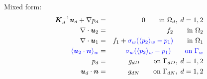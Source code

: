   Mixed form:
  \begin{eqnarray}
\mathbf{\boldsymbol{K}}_d^{-1}\mathbf{\boldsymbol{u}}_d + \nabla p_d &=& 0 \qquad \textrm{in } \Omega_d,\; d=1,2  \\
\nabla \cdot \mathbf{\boldsymbol{u}}_2 &=& f_2 \qquad \textrm{in } \Omega_2\\
\nabla \cdot \mathbf{\boldsymbol{u}}_1 &=& f_1 + {\color{blue}\sigma_w(\langle p_2\rangle_w-p_1)}\qquad \textrm{in } \Omega_1\\
\color{blue}\langle\mathbf{\boldsymbol{u}}_2 \cdot \mathbf{\boldsymbol{n}}\rangle_w &=& \color{blue}\sigma_w (\langle p_2\rangle_w - p_{1}) \qquad \textrm{on } \Gamma_w\\
p_d &=& g_{dD} \qquad \textrm{on } \Gamma_{dD},\; d=1,2 \\
\mathbf{\boldsymbol{u}}_d \cdot \mathbf{\boldsymbol{n}} &=& g_{dN} \qquad \textrm{on } \Gamma_{dN},\; d=1,2
  \end{eqnarray}



  
 

